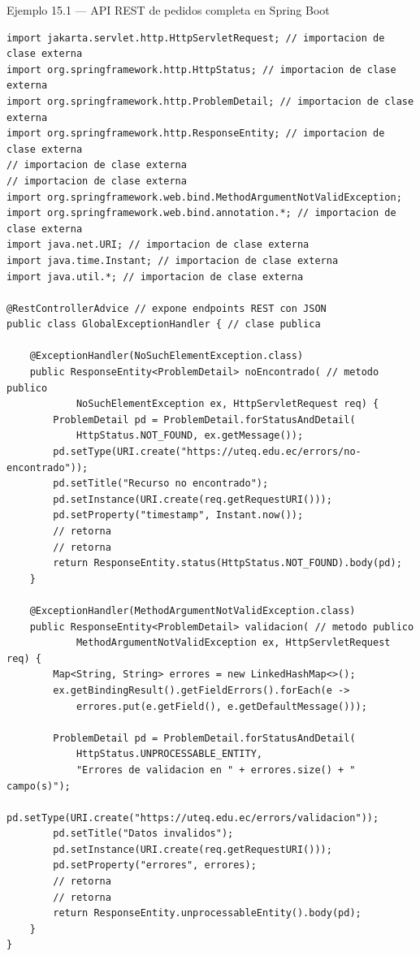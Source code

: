 \begin{cajaejemplo}{Ejemplo 15.1 --- API REST de pedidos completa en Spring Boot}
\begin{lstlisting}[style=java,caption={GlobalExceptionHandler.java},label=lst:15.3]
import jakarta.servlet.http.HttpServletRequest; // importacion de clase externa
import org.springframework.http.HttpStatus; // importacion de clase externa
import org.springframework.http.ProblemDetail; // importacion de clase externa
import org.springframework.http.ResponseEntity; // importacion de clase externa
// importacion de clase externa
// importacion de clase externa
import org.springframework.web.bind.MethodArgumentNotValidException;
import org.springframework.web.bind.annotation.*; // importacion de clase externa
import java.net.URI; // importacion de clase externa
import java.time.Instant; // importacion de clase externa
import java.util.*; // importacion de clase externa

@RestControllerAdvice // expone endpoints REST con JSON
public class GlobalExceptionHandler { // clase publica

    @ExceptionHandler(NoSuchElementException.class)
    public ResponseEntity<ProblemDetail> noEncontrado( // metodo publico
            NoSuchElementException ex, HttpServletRequest req) {
        ProblemDetail pd = ProblemDetail.forStatusAndDetail(
            HttpStatus.NOT_FOUND, ex.getMessage());
        pd.setType(URI.create("https://uteq.edu.ec/errors/no-encontrado"));
        pd.setTitle("Recurso no encontrado");
        pd.setInstance(URI.create(req.getRequestURI()));
        pd.setProperty("timestamp", Instant.now());
        // retorna
        // retorna
        return ResponseEntity.status(HttpStatus.NOT_FOUND).body(pd);
    }

    @ExceptionHandler(MethodArgumentNotValidException.class)
    public ResponseEntity<ProblemDetail> validacion( // metodo publico
            MethodArgumentNotValidException ex, HttpServletRequest req) {
        Map<String, String> errores = new LinkedHashMap<>();
        ex.getBindingResult().getFieldErrors().forEach(e ->
            errores.put(e.getField(), e.getDefaultMessage()));

        ProblemDetail pd = ProblemDetail.forStatusAndDetail(
            HttpStatus.UNPROCESSABLE_ENTITY,
            "Errores de validacion en " + errores.size() + " campo(s)");
        pd.setType(URI.create("https://uteq.edu.ec/errors/validacion"));
        pd.setTitle("Datos invalidos");
        pd.setInstance(URI.create(req.getRequestURI()));
        pd.setProperty("errores", errores);
        // retorna
        // retorna
        return ResponseEntity.unprocessableEntity().body(pd);
    }
}
\end{lstlisting}
\end{cajaejemplo}

